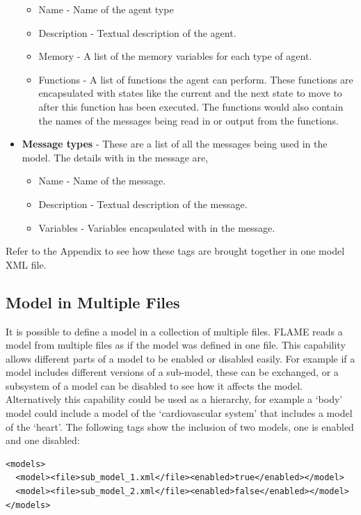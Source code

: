 \documentclass[a4paper,11pt]{article}
\newenvironment{mylisting}
{\begin{list}{}{\setlength{\leftmargin}{1em}}\item\small\bfseries}
{\end{list}}
\begin{document}
\begin{itemize}
\begin{itemize}
\item Name - Name of the agent type
\item Description - Textual description of the agent.
\item Memory - A list of the memory variables for each type of agent.
\item Functions - A list of functions the agent can perform. These functions are encapsulated with states like the current and the next state to move to after this function has been executed. The functions would also contain the names of the messages being read in or output from the functions.
\end{itemize}
\item \textbf{Message types} - These are a list of all the messages being used in the
model. The details with in the message are,
\begin{itemize}
\item Name - Name of the message.
\item Description - Textual description of the message.
\item Variables - Variables encapsulated with in the message.
\end{itemize}
\end{itemize}

Refer to the Appendix to see how these tags are brought together in
one model XML file.

\subsection{Model in Multiple Files}

It is possible to define a model in a collection of multiple files.
FLAME reads a model from multiple files as if the model was defined
in one file. This capability allows different parts of a model to be
enabled or disabled easily. For example if a model includes
different versions of a sub-model, these can be exchanged, or a
subsystem of a model can be disabled to see how it affects the
model. Alternatively this capability could be used as a hierarchy,
for example a `body' model could include a model of the
`cardiovascular system' that includes a model of the `heart'. The
following tags show the inclusion of two models, one is enabled and
one disabled:

\begin{mylisting}
\begin{verbatim}
<models>
  <model><file>sub_model_1.xml</file><enabled>true</enabled></model>
  <model><file>sub_model_2.xml</file><enabled>false</enabled></model>
</models>
\end{verbatim}
\end{mylisting}
\end{document}
